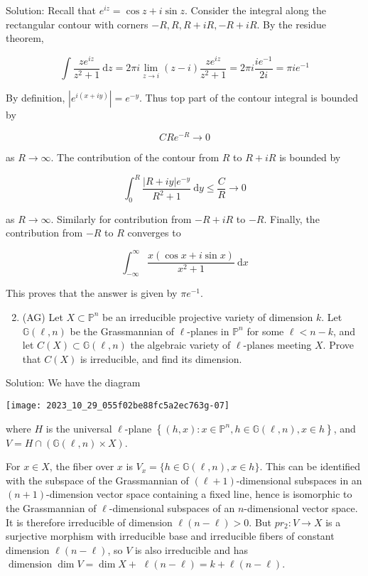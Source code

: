 \documentclass[10pt]{article}
\begin{document}
Solution: Recall that $e^{i z}=\cos z+i \sin z$. Consider the integral along the rectangular contour with corners $-R, R, R+i R,-R+i R$. By the residue theorem,

$$
\int \frac{z e^{i z}}{z^{2}+1} \mathrm{~d} z=2 \pi i \lim _{z \rightarrow i}(z-i) \frac{z e^{i z}}{z^{2}+1}=2 \pi i \frac{i e^{-1}}{2 i}=\pi i e^{-1}
$$

By definition, $\left|e^{i(x+i y)}\right|=e^{-y}$. Thus top part of the contour integral is bounded by

$$
C R e^{-R} \rightarrow 0
$$

as $R \rightarrow \infty$. The contribution of the contour from $R$ to $R+i R$ is bounded by

$$
\int_{0}^{R} \frac{|R+i y| e^{-y}}{R^{2}+1} \mathrm{~d} y \leq \frac{C}{R} \rightarrow 0
$$

as $R \rightarrow \infty$. Similarly for contribution from $-R+i R$ to $-R$. Finally, the contribution from $-R$ to $R$ converges to

$$
\int_{-\infty}^{\infty} \frac{x(\cos x+i \sin x)}{x^{2}+1} \mathrm{~d} x
$$

This proves that the answer is given by $\pi e^{-1}$.

\begin{enumerate}
  \setcounter{enumi}{1}
  \item (AG) Let $X \subset \mathbb{P}^{n}$ be an irreducible projective variety of dimension $k$. Let $\mathbb{G}(\ell, n)$ be the Grassmannian of $\ell$-planes in $\mathbb{P}^{n}$ for some $\ell<n-k$, and let $C(X) \subset \mathbb{G}(\ell, n)$ the algebraic variety of $\ell$-planes meeting $X$. Prove that $C(X)$ is irreducible, and find its dimension.
\end{enumerate}

Solution: We have the diagram

\begin{center}
\texttt{[image: 2023\_10\_29\_055f02be88fc5a2ec763g-07]}
\end{center}

where $H$ is the universal $\ell$-plane $\left\{(h, x): x \in \mathbb{P}^{n}, h \in \mathbb{G}(\ell, n), x \in h\right\}$, and $V=H \cap(\mathbb{G}(\ell, n) \times X)$.

For $x \in X$, the fiber over $x$ is $V_{x}=\{h \in \mathbb{G}(\ell, n), x \in h\}$. This can be identified with the subspace of the Grassmannian of $(\ell+1)$-dimensional subspaces in an $(n+1)$-dimension vector space containing a fixed line, hence is isomorphic to the Grassmannian of $\ell$-dimensional subspaces of an $n$-dimensional vector space. It is therefore irreducible of dimension $\ell(n-\ell)>0$. But $p r_{2}: V \rightarrow X$ is a surjective morphism with irreducible base and irreducible fibers of constant dimension $\ell(n-\ell)$, so $V$ is also irreducible and has $\operatorname{dimension} \operatorname{dim} V=\operatorname{dim} X+$ $\ell(n-\ell)=k+\ell(n-\ell)$.
\end{document}
